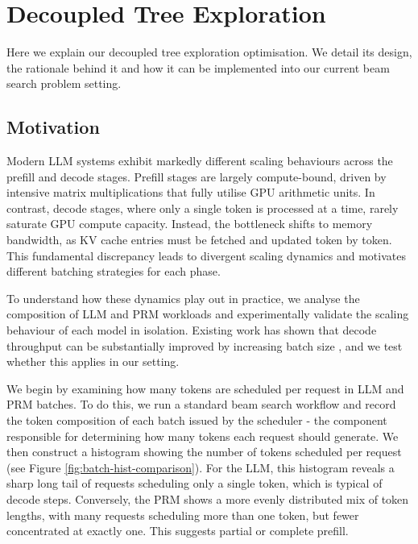 \documentclass[11pt,twoside]{report}
\begin{document}
\chapter{Decoupled Tree Exploration}
Here we explain our decoupled tree exploration optimisation.
We detail its design, the rationale behind it and how it can be implemented into our current beam search problem setting.

\section{Motivation}
Modern LLM systems exhibit markedly different scaling behaviours across the prefill and decode stages. 
Prefill stages are largely compute-bound, driven by intensive matrix multiplications that fully utilise GPU arithmetic units. 
In contrast, decode stages, where only a single token is processed at a time, rarely saturate GPU compute capacity. 
Instead, the bottleneck shifts to memory bandwidth, as KV cache entries must be fetched and updated token by token. 
This fundamental discrepancy leads to divergent scaling dynamics and motivates different batching strategies for each phase.

To understand how these dynamics play out in practice, we analyse the composition of LLM and PRM workloads and experimentally validate the scaling behaviour of each model in isolation. 
Existing work has shown that decode throughput can be substantially improved by increasing batch size \cite{agrawal2024taming}, and we test whether this applies in our setting.

We begin by examining how many tokens are scheduled per request in LLM and PRM batches. 
To do this, we run a standard beam search workflow and record the token composition of each batch issued by the scheduler - the component responsible for determining how many tokens each request should generate. 
We then construct a histogram showing the number of tokens scheduled per request (see Figure \ref{fig:batch-hist-comparison}). 
For the LLM, this histogram reveals a sharp long tail of requests scheduling only a single token, which is typical of decode steps. 
Conversely, the PRM shows a more evenly distributed mix of token lengths, with many requests scheduling more than one token, but fewer concentrated at exactly one. This suggests partial or complete prefill.
\end{document}
